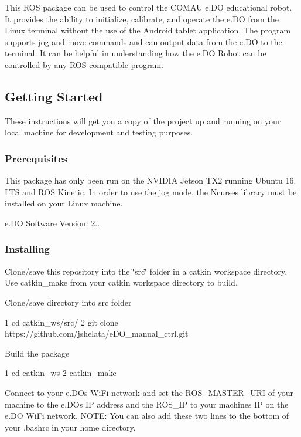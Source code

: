 This R\+OS package can be used to control the C\+O\+M\+AU e.\+DO educational robot. It provides the ability to initialize, calibrate, and operate the e.\+DO from the Linux terminal without the use of the Android tablet application. The program supports jog and move commands and can output data from the e.\+DO to the terminal. It can be helpful in understanding how the e.\+DO Robot can be controlled by any R\+OS compatible program.

\subsection*{Getting Started}

These instructions will get you a copy of the project up and running on your local machine for development and testing purposes.

\subsubsection*{Prerequisites}

This package has only been run on the N\+V\+I\+D\+IA Jetson T\+X2 running Ubuntu 16. L\+TS and R\+OS Kinetic. In order to use the jog mode, the Ncurses library must be installed on your Linux machine.

e.\+DO Software Version\+: 2..

\subsubsection*{Installing}

Clone/save this repository into the \char`\"{}src\char`\"{} folder in a catkin workspace directory. Use catkin\+\_\+make from your catkin workspace directory to build.

Clone/save directory into src folder


\begin{DoxyCode}
1 cd catkin\_ws/src/
2 git clone https://github.com/jshelata/eDO\_manual\_ctrl.git
\end{DoxyCode}


Build the package


\begin{DoxyCode}
1 cd catkin\_ws
2 catkin\_make
\end{DoxyCode}


Connect to your e.\+DO\textquotesingle{}s Wi\+Fi network and set the R\+O\+S\+\_\+\+M\+A\+S\+T\+E\+R\+\_\+\+U\+RI of your machine to the e.\+DO\textquotesingle{}s IP address and the R\+O\+S\+\_\+\+IP to your machine\textquotesingle{}s IP on the e.\+DO Wi\+Fi network. N\+O\+TE\+: You can also add these two lines to the bottom of your .bashrc in your home directory.


